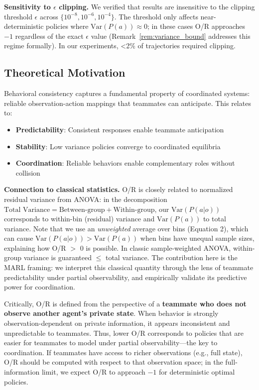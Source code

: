 \documentclass[twoside]{article}
\theoremstyle{remark}
\begin{document}
\textbf{Sensitivity to $\epsilon$ clipping.} We verified that results are insensitive to the clipping threshold $\epsilon$ across $\{10^{-8}, 10^{-6}, 10^{-4}\}$. The threshold only affects near-deterministic policies where $\text{Var}(P(a)) \approx 0$; in these cases O/R approaches $-1$ regardless of the exact $\epsilon$ value (Remark~\ref{rem:variance_bound} addresses this regime formally). In our experiments, <2\% of trajectories required clipping.

\subsection{Theoretical Motivation}

Behavioral consistency captures a fundamental property of coordinated systems: reliable observation-action mappings that teammates can anticipate. This relates to:

\begin{itemize}
    \item \textbf{Predictability}: Consistent responses enable teammate anticipation
    \item \textbf{Stability}: Low variance policies converge to coordinated equilibria
    \item \textbf{Coordination}: Reliable behaviors enable complementary roles without collision
\end{itemize}

\textbf{Connection to classical statistics.} O/R is closely related to normalized residual variance from ANOVA: in the decomposition $\text{Total Variance} = \text{Between-group} + \text{Within-group}$, our $\text{Var}(P(a|o))$ corresponds to within-bin (residual) variance and $\text{Var}(P(a))$ to total variance. Note that we use an \textit{unweighted} average over bins (Equation 2), which can cause $\text{Var}(P(a|o)) > \text{Var}(P(a))$ when bins have unequal sample sizes, explaining how O/R $>$ 0 is possible. In classic sample-weighted ANOVA, within-group variance is guaranteed $\leq$ total variance. The contribution here is the MARL framing: we interpret this classical quantity through the lens of teammate predictability under partial observability, and empirically validate its predictive power for coordination.

Critically, O/R is defined from the perspective of a \textbf{teammate who does not observe another agent's private state}. When behavior is strongly observation-dependent on private information, it appears inconsistent and unpredictable to teammates. Thus, lower O/R corresponds to policies that are easier for teammates to model under partial observability—the key to coordination. If teammates have access to richer observations (e.g., full state), O/R should be computed with respect to that observation space; in the full-information limit, we expect O/R to approach $-1$ for deterministic optimal policies.
\end{document}
